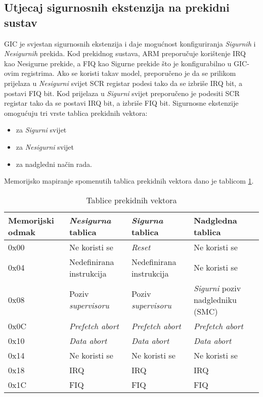 \documentclass[times, utf8, diplomski, numeric]{fer}
\begin{document}
\subsection{Utjecaj sigurnosnih ekstenzija na prekidni sustav}
GIC je svjestan sigurnosnih ekstenzija i daje mogućnost konfiguriranja \textit{Sigurnih} i \textit{Nesigurnih} prekida. Kod prekidnog sustava,
ARM preporučuje korištenje IRQ kao Nesigurne prekide, a FIQ kao Sigurne prekide što je konfigurabilno u GIC-ovim registrima.
Ako se koristi takav model, preporučeno je da se prilikom prijelaza u \textit{Nesigurni} svijet SCR registar podesi tako da se izbriše
IRQ bit, a postavi FIQ bit. Kod prijelaza u \textit{Sigurni} svijet preporučeno je podesiti SCR registar tako da se postavi IRQ bit, a
izbriše FIQ bit.
Sigurnosne ekstenzije omogućuju tri vrste tablica prekidnih vektora:
\begin{itemize}
  \item{za \textit{Sigurni} svijet}
  \item{za \textit{Nesigurni} svijet}
  \item{za nadgledni način rada.}
\end{itemize}
Memorijsko mapiranje spomenutih tablica prekidnih vektora dano je tablicom \ref{vector_table}.
\begin{table}[H]
  \centering
  \caption{Tablice prekidnih vektora}
  \label{vector_table}
  \begin{tabular}{|| p{2cm} | p{3cm} | p{3cm} | p{3cm} ||}
    \hline
    \textbf{Memorijski odmak} & \textbf{\textit{Nesigurna} tablica} & \textbf{\textit{Sigurna} tablica} & \textbf{Nadgledna tablica} \\
    \hline\hline
    0x00 & Ne koristi se & \textit{Reset} & Ne koristi se\\
    \hline
    0x04 & Nedefinirana instrukcija & Nedefinirana instrukcija & Ne koristi se\\
    \hline
    0x08 & Poziv \textit{supervisoru} & Poziv \textit{supervisoru} & \textit{Sigurni} poziv nadgledniku (SMC)\\
    \hline
    0x0C & \textit{Prefetch abort} & \textit{Prefetch abort} & \textit{Prefetch abort}\\
    \hline
    0x10 & \textit{Data abort} & \textit{Data abort} & \textit{Data abort}\\
    \hline
    0x14 & Ne koristi se & Ne koristi se & Ne koristi se\\
    \hline
    0x18 & IRQ & IRQ & IRQ\\
    \hline
    0x1C & FIQ & FIQ & FIQ\\
    \hline
  \end{tabular}
\end{table}
\end{document}
